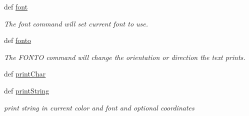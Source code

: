 \begin{DoxyCompactItemize}
def \hyperlink{group___bitmap_font_ga7099c8ffc9b76ad3213d241bb8b8070f}{font}
\begin{DoxyCompactList}\small\item\em The font command will set current font to use. \end{DoxyCompactList}\item 
def \hyperlink{group___bitmap_font_ga445e7a916dbdae456f88bea5fcd88745}{fonto}
\begin{DoxyCompactList}\small\item\em The F\-O\-N\-T\-O command will change the orientation or direction the text prints. \end{DoxyCompactList}\item 
def \hyperlink{group___bitmap_font_gafe8f092541df1ab4d72798e5f3b4e66d}{print\-Char}
\item 
def \hyperlink{group___bitmap_font_gac3a90d479a0423de66988b9850f4852c}{print\-String}
\begin{DoxyCompactList}\small\item\em print string in current color and font and optional coordinates \end{DoxyCompactList}\end{DoxyCompactItemize}

